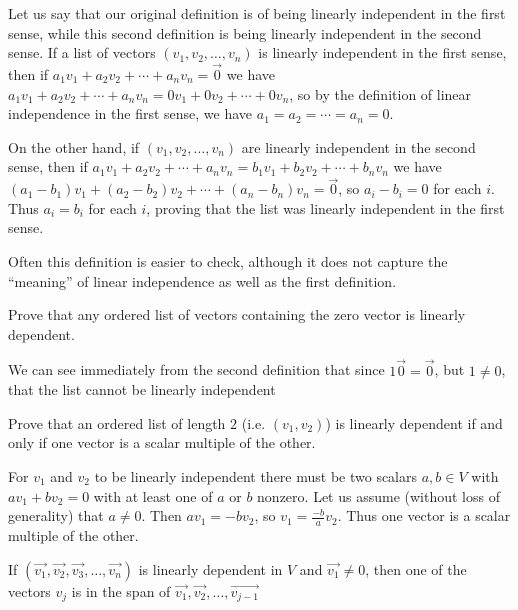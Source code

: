 \documentclass{ximera}
\begin{document}
 
 \begin{free-response}
	Let us say that our original definition is of  being linearly independent in the first sense, while this second definition is being linearly independent 
	in the second sense.  If a list of vectors $(v_1,v_2,\ldots,v_n)$ is linearly independent in the first sense, then if $a_1v_1+a_2v_2 + \cdots +a_nv_n = \vec{0}$ we have
	$a_1v_1+a_2v_2 + \cdots +a_nv_n = 0v_1+0v_2+ \cdots +0v_n$, so by the definition of linear independence in the first sense, we have $a_1=a_2= \cdots =a_n=0$.
	
	On the other hand, if $(v_1,v_2,\ldots,v_n)$ are linearly independent in the second sense, then if $a_1v_1+a_2v_2 + \cdots +a_nv_n = b_1v_1 + b_2v_2 + \cdots + b_nv_n$ we have
	$(a_1-b_1)v_1+(a_2-b_2)v_2+\cdots+(a_n-b_n)v_n = \vec{0}$, so $a_i-b_i=0$ for each $i$.  Thus $a_i=b_i$ for each $i$, proving that the list was linearly independent 
	in the first sense.
 \end{free-response}
 
  	Often this definition is easier to check, although it does not capture the ``meaning'' of linear independence as well as the first definition.

 
 	Prove that any ordered list of vectors containing the zero vector is linearly dependent. 
	\begin{free-response}
		We can see immediately from the second definition that since $1\vec{0} = \vec{0}$, but $1\neq 0$, that the list cannot be linearly independent
	\end{free-response}
 
 	Prove that an ordered list of length $2$ (i.e. $(v_1,v_2)$) is linearly dependent if and only if one vector is a scalar multiple of the other.
	\begin{free-response}
		For $v_1$ and $v_2$ to be linearly independent there must be two scalars $a,b \in V$ with $av_1+bv_2=0$ with at least one of $a$ or $b$ nonzero.
		Let us assume (without loss of generality) that $a \neq 0$.  Then $av_1=-bv_2$, so $v_1=\frac{-b}{a}v_2$.  Thus one vector is a scalar multiple of the other.	
	
		\end{free-response}


 \begin{theorem}
 	If $(\vec{v_1},\vec{v_2},\vec{v_3}, \ldots, \vec{v_n})$ is linearly dependent in $V$ and $\vec{v_1} \neq 0$, then one of the vectors $v_j$ is in the 
 	span of $\vec{v_1},\vec{v_2},\ldots,\vec{v_{j-1}}$
 \end{theorem}
 
\end{document}

